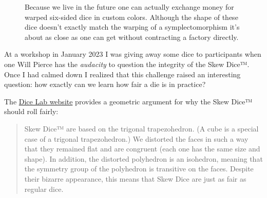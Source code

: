 \documentclass[
  letterpaper,
  DIV=11,
  numbers=noendperiod]{scrartcl}
\begin{document}
\begin{figure}


\caption{\label{fig-warped-dice}Because we live in the future one can
actually exchange money for warped six-sided dice in custom colors.
Although the shape of these dice doesn't exactly match the warping of a
symplectomorphism it's about as close as one can get without contracting
a factory directly.}

\end{figure}%

At a workshop in January 2023 I was giving away some dice to
participants when one Will Pierce has the \emph{audacity} to question
the integrity of the Skew Dice™. Once I had calmed down I realized that
this challenge raised an interesting question: how exactly can we learn
how fair a die is in practice?

The
\href{https://www.mathartfun.com/thedicelab.com/DiceDesign.html}{Dice
Lab website} provides a geometric argument for why the Skew Dice™ should
roll fairly:

\begin{quote}
Skew Dice™ are based on the trigonal trapezohedron. (A cube is a special
case of a trigonal trapezohedron.) We distorted the faces in such a way
that they remained flat and are congruent (each one has the same size
and shape). In addition, the distorted polyhedron is an isohedron,
meaning that the symmetry group of the polyhedron is transitive on the
faces. Despite their bizarre appearance, this means that Skew Dice are
just as fair as regular dice.
\end{quote}
\end{document}
